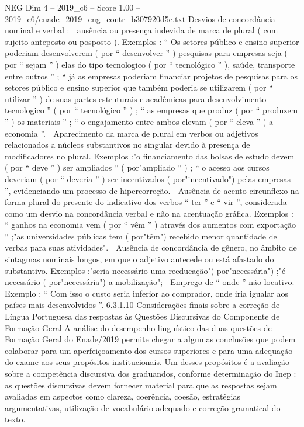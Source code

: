 \begin{textsample}{NEG Dim 4 – 2019\_c6 – Score 1.00 – 2019\_c6/enade\_2019\_eng\_contr\_b307920d5e.txt}
Desvios de concordância nominal e verbal :  ausência ou presença indevida de marca de plural ( com sujeito anteposto ou posposto ).
Exemplos : “ Os setores público e ensino superior poderiam desenvolverem ( por “ desenvolver ” ) pesquisas para empresas seja ( por “ sejam ” ) elas do tipo tecnologico ( por “ tecnológico ” ), saúde, transporte entre outros ” ; “ já as empresas poderiam financiar projetos de pesquisas para os setores público e ensino superior que também poderia se utilizarem ( por “ utilizar ” ) de suas partes estruturais e acadêmicas para desenvolvimento tecnologico ” ( por “ tecnológico ” ) ; “ as empresas que produz ( por “ produzem ” ) os materiais ” ; “ o engajamento entre ambos elevam ( por “ eleva ” ) a economia ”.  Aparecimento da marca de plural em verbos ou adjetivos relacionados a núcleos substantivos no singular devido à presença de modificadores no plural.
Exemplos :"o financiamento das bolsas de estudo devem ( por “ deve ” ) ser ampliados ” ( por"ampliado ” ) ; “ o acesso aos cursos deveriam ( por “ deveria ” ) ser incentivados ( por"incentivado") pelas empresas ”, evidenciando um processo de hipercorreção.  Ausência de acento circunflexo na forma plural do presente do indicativo dos verbos “ ter ” e “ vir ”, considerada como um desvio na concordância verbal e não na acentuação gráfica.
Exemplos : “ ganhos na economia vem ( por “ vêm ” ) através dos aumentos com exportação ” ;"as universidades públicas tem ( por"têm") recebido menor quantidade de verbas para suas atividades".  Ausência de concordância de gênero, no âmbito de sintagmas nominais longos, em que o adjetivo antecede ou está afastado do substantivo.
Exemplos :"seria necessário uma reeducação"( por"necessária") ;"é necessário ( por"necessária") a mobilização";  Emprego de “ onde ” não locativo.
Exemplo : “ Com isso o custo seria inferior ao comprador, onde iria igualar aos países mais desenvolvidos ”. 6.3.1.10 Considerações finais sobre a correção de Língua Portuguesa das respostas às Questões Discursivas do Componente de Formação Geral A análise do desempenho linguístico das duas questões de Formação Geral do Enade/2019 permite chegar a algumas conclusões que podem colaborar para um aperfeiçoamento dos cursos superiores e para uma adequação do exame aos seus propósitos institucionais.
Um desses propósitos é a avaliação sobre a competência discursiva dos graduandos, conforme determinação do Inep : as questões discursivas devem fornecer material para que as respostas sejam avaliadas em aspectos como clareza, coerência, coesão, estratégias argumentativas, utilização de vocabulário adequado e correção gramatical do texto.

\end{textsample}
